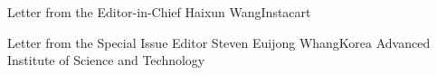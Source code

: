 \documentclass[11pt]{article}
\begin{document}


\begin{bulletin}


%
%

\begin{lettersection}


\begin{letter}{Letter from the Editor-in-Chief}
 {Haixun Wang}{Instacart}
 
\end{letter}

\newpage


\newpage



\begin{letter}{Letter from the Special Issue Editor}
{Steven Euijong Whang}{Korea Advanced Institute of Science and Technology}

\end{letter}

\end{lettersection}


\end{bulletin}
\end{document}
